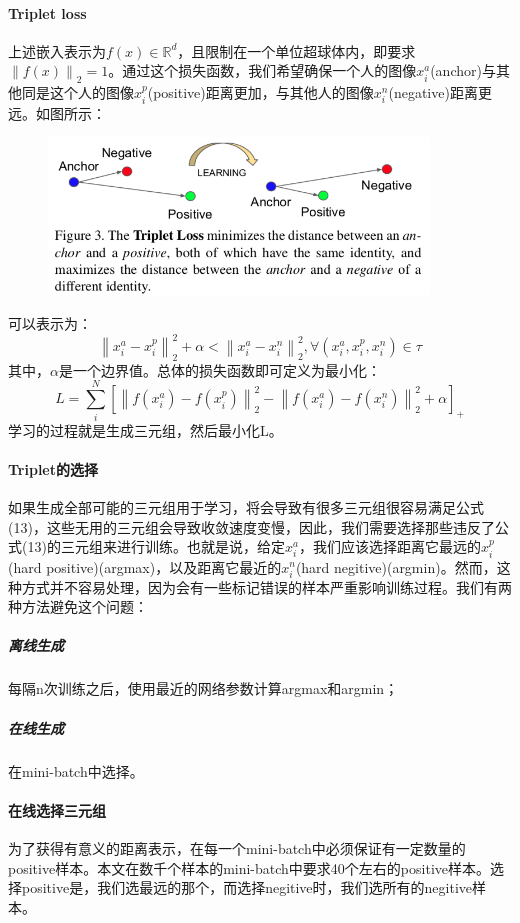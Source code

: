 \documentclass[10pt,letterpaper]{article}
\begin{document}
\paragraph{Triplet loss} 上述嵌入表示为$f(x) \in \mathbb{R}^d$，且限制在一个单位超球体内，即要求$\left \|f(x) \right \|_2=1$。通过这个损失函数，我们希望确保一个人的图像$x_i^a$(anchor)与其他同是这个人的图像$x_i^p$(positive)距离更加，与其他人的图像$x_i^n$(negative)距离更远。如图所示：
\begin{figure}[H]
	\centering
	\includegraphics[width=0.9\textwidth]{../images/triplet-loss.png}
	\caption{}
	\label{Triplet Loss}
\end{figure}
可以表示为：
\begin{equation}
	\left \| x_i^a - x_i^p \right \|_2^2 + \alpha < \left \| x_i^a - x_i^n \right \|_2^2, \forall(x_i^a, x_i^p, x_i^n) \in \tau
\end{equation}
其中，$\alpha$是一个边界值。总体的损失函数即可定义为最小化：
\begin{equation}
	L=\sum_i^N \left [ \left \| f(x_i^a) - f(x_i^p) \right \|_2^2 - \left \| f(x_i^a) - f(x_i^n) \right \|_2^2 + \alpha \right ]_+
\end{equation}
学习的过程就是生成三元组，然后最小化L。
\paragraph{Triplet的选择} 如果生成全部可能的三元组用于学习，将会导致有很多三元组很容易满足公式(13)，这些无用的三元组会导致收敛速度变慢，因此，我们需要选择那些违反了公式(13)的三元组来进行训练。也就是说，给定$x_i^a$，我们应该选择距离它最远的$x_i^p$(hard positive)(argmax)，以及距离它最近的$x_i^n$(hard negitive)(argmin)。然而，这种方式并不容易处理，因为会有一些标记错误的样本严重影响训练过程。我们有两种方法避免这个问题：
	\subparagraph{离线生成} 每隔n次训练之后，使用最近的网络参数计算argmax和argmin；
	\subparagraph{在线生成} 在mini-batch中选择。
	
\paragraph{在线选择三元组} 为了获得有意义的距离表示，在每一个mini-batch中必须保证有一定数量的positive样本。本文在数千个样本的mini-batch中要求40个左右的positive样本。选择positive是，我们选最远的那个，而选择negitive时，我们选所有的negitive样本。



\newpage


\end{document}
